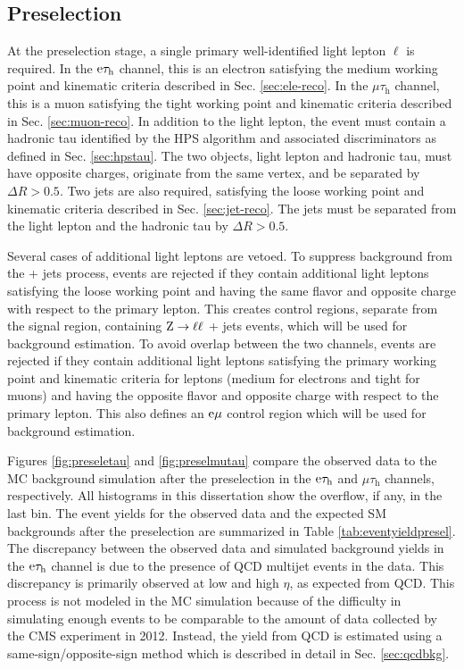 \documentclass[12pt]{thesis}  %
\newcommand{\tauh}{\ensuremath{\tau_{\text{h}}}\xspace}
\newcommand{\Pe}{\ensuremath{\cmsSymbolFace{e}}\xspace}
\newcommand{\mutau}{\ensuremath{\mu\tauh}\xspace}
\newcommand{\etau}{\ensuremath{\Pe\tauh}\xspace}
\newcommand{\emu}{\ensuremath{\Pe\mu}\xspace}
\begin{document}
\subsection{Preselection
\label{sec:presel}}

At the preselection stage, a single primary well-identified light lepton $\ell$ is required. In the \etau channel, this is an electron satisfying the medium working point and kinematic criteria described in Sec. \ref{sec:ele-reco}. In the \mutau channel, this is a muon satisfying the tight working point and kinematic criteria described in Sec. \ref{sec:muon-reco}. In addition to the light lepton, the event must contain a hadronic tau identified by the HPS algorithm and associated discriminators as defined in Sec. \ref{sec:hpstau}. The two objects, light lepton and hadronic tau, must have opposite charges, originate from the same vertex, and be separated by $\Delta R > 0.5$. Two jets are also required, satisfying the loose working point and kinematic criteria described in Sec. \ref{sec:jet-reco}. The jets must be separated from the light lepton and the hadronic tau by $\Delta R > 0.5$.

Several cases of additional light leptons are vetoed. To suppress background from the \Z + jets process, events are rejected if they contain additional light leptons satisfying the loose working point and having the same flavor and opposite charge with respect to the primary lepton. This creates control regions, separate from the signal region, containing $\mathrm{Z} \rightarrow \ell\ell$ + jets events, which will be used for background estimation. To avoid overlap between the two channels, events are rejected if they contain additional light leptons satisfying the primary working point and kinematic criteria for leptons (medium for electrons and tight for muons) and having the opposite flavor and opposite charge with respect to the primary lepton. This also defines an \emu control region which will be used for background estimation.

Figures \ref{fig:preseletau} and \ref{fig:preselmutau} compare the observed data to the MC background simulation after the preselection in the \etau and \mutau channels, respectively. All histograms in this dissertation show the overflow, if any, in the last bin. The event yields for the observed data and the expected SM backgrounds after the preselection are summarized in Table \ref{tab:eventyieldpresel}. The discrepancy between the observed data and simulated background yields in the \etau channel is due to the presence of QCD multijet events in the data. This discrepancy is primarily observed at low \pt and high $\eta$, as expected from QCD. This process is not modeled in the MC simulation because of the difficulty in simulating enough events to be comparable to the amount of data collected by the CMS experiment in 2012. Instead, the yield from QCD is estimated using a same-sign/opposite-sign method which is described in detail in Sec. \ref{sec:qcdbkg}.
\end{document}
